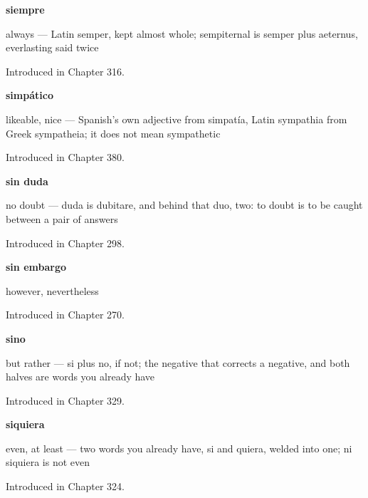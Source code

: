 \noindent\begin{minipage}[t]{\linewidth}
\raggedright
\textbf{siempre}\par
\small always — Latin semper, kept almost whole; sempiternal is semper plus aeternus, everlasting said twice\par
\footnotesize Introduced in Chapter 316.
\end{minipage}\par\medskip

\noindent\begin{minipage}[t]{\linewidth}
\raggedright
\textbf{simpático}\par
\small likeable, nice — Spanish's own adjective from simpatía, Latin sympathia from Greek sympatheia; it does not mean sympathetic\par
\footnotesize Introduced in Chapter 380.
\end{minipage}\par\medskip

\noindent\begin{minipage}[t]{\linewidth}
\raggedright
\textbf{sin duda}\par
\small no doubt — duda is dubitare, and behind that duo, two: to doubt is to be caught between a pair of answers\par
\footnotesize Introduced in Chapter 298.
\end{minipage}\par\medskip

\noindent\begin{minipage}[t]{\linewidth}
\raggedright
\textbf{sin embargo}\par
\small however, nevertheless\par
\footnotesize Introduced in Chapter 270.
\end{minipage}\par\medskip

\noindent\begin{minipage}[t]{\linewidth}
\raggedright
\textbf{sino}\par
\small but rather — si plus no, if not; the negative that corrects a negative, and both halves are words you already have\par
\footnotesize Introduced in Chapter 329.
\end{minipage}\par\medskip

\noindent\begin{minipage}[t]{\linewidth}
\raggedright
\textbf{siquiera}\par
\small even, at least — two words you already have, si and quiera, welded into one; ni siquiera is not even\par
\footnotesize Introduced in Chapter 324.
\end{minipage}\par\medskip

